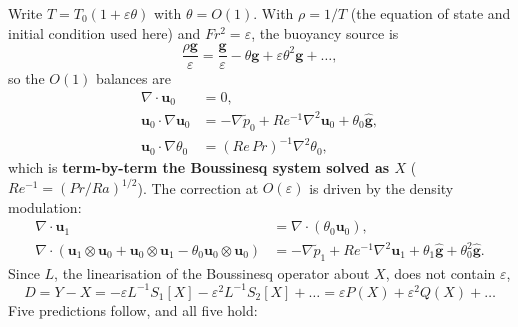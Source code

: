 \documentclass[11pt,a4paper]{article}
\begin{document}
Write $T=T_0(1+\varepsilon\theta)$ with $\theta=O(1)$. With $\rho=1/T$ (the equation of state and
initial condition used here) and $Fr^2=\varepsilon$, the buoyancy source is
\begin{equation}
\frac{\rho\bm g}{\varepsilon}=\frac{\bm g}{\varepsilon}-\theta\bm g+\varepsilon\theta^2\bm g+\dots,
\label{eq:buoyancy}
\end{equation}
so the $O(1)$ balances are
\begin{align}
\nabla\cdot\bm u_0&=0,\label{eq:o1mass}\\
\bm u_0\cdot\nabla\bm u_0&=-\nabla\tilde p_0+Re^{-1}\nabla^2\bm u_0+\theta_0\hat{\bm g},\label{eq:o1mom}\\
\bm u_0\cdot\nabla\theta_0&=(Re\,Pr)^{-1}\nabla^2\theta_0,\label{eq:o1energy}
\end{align}
which is \textbf{term-by-term the Boussinesq system solved as $X$} ($Re^{-1}=(Pr/Ra)^{1/2}$). The
correction at $O(\varepsilon)$ is driven by the density modulation:
\begin{align}
\nabla\cdot\bm u_1&=\nabla\cdot(\theta_0\bm u_0),\label{eq:div1}\\
\nabla\cdot(\bm u_1\otimes\bm u_0+\bm u_0\otimes\bm u_1-\theta_0\bm u_0\otimes\bm u_0)
&=-\nabla\tilde p_1+Re^{-1}\nabla^2\bm u_1+\theta_1\hat{\bm g}+\theta_0^2\hat{\bm g}.\label{eq:mom1}
\end{align}
Since $L$, the linearisation of the Boussinesq operator about $X$, does not contain $\varepsilon$,
\begin{equation}
D=Y-X=-\varepsilon L^{-1}S_1[X]-\varepsilon^2L^{-1}S_2[X]+\dots
=\varepsilon P(X)+\varepsilon^2Q(X)+\dots
\label{eq:factor}
\end{equation}
Five predictions follow, and all five hold:
\end{document}
